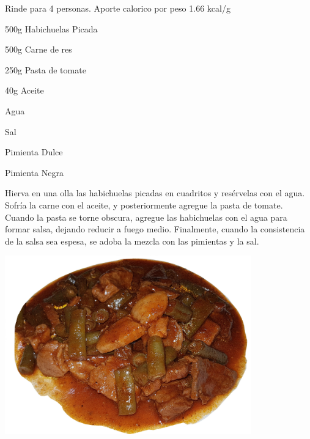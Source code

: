 
Rinde para 4 personas. Aporte calorico por peso 1.66 kcal/g

\begin{ingredientes}
\item 500g Habichuelas Picada
\item 500g Carne de res
\item 250g Pasta de tomate
\item 40g Aceite
\item Agua
\item Sal
\item Pimienta Dulce
\item Pimienta Negra
\end{ingredientes}
\preparacion

Hierva en una olla las habichuelas picadas en cuadritos y resérvelas con el agua. Sofría la carne con el aceite, y posteriormente agregue la pasta de tomate. Cuando  la pasta se torne obscura, agregue las habichuelas con el agua para formar salsa, dejando reducir a fuego medio. Finalmente, cuando la consistencia de la salsa sea espesa, se adoba la mezcla con las pimientas y la sal.

\includegraphics[width=0.8\textwidth]{fotos/habichuelas.jpg} 

